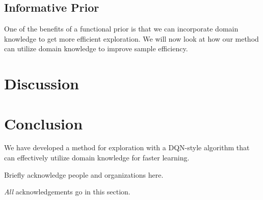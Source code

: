 \documentclass[]{uai2021} %
\begin{document}
\subsection{Informative Prior}
One of the benefits of a functional prior is that we can incorporate domain knowledge to
get more efficient exploration. We will now look at how our method can utilize domain
knowledge to improve sample efficiency.




\section{Discussion}

\section{Conclusion}
We have developed a method for exploration with a DQN-style algorithm that can
effectively utilize domain knowledge for faster learning.


\begin{acknowledgements} %
    Briefly acknowledge people and organizations here.

    \emph{All} acknowledgements go in this section.
\end{acknowledgements}


\end{document}
